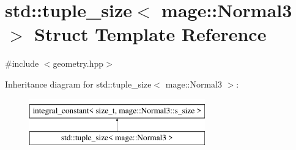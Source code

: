\hypertarget{structstd_1_1tuple__size_3_01mage_1_1_normal3_01_4}{}\section{std\+:\+:tuple\+\_\+size$<$ mage\+:\+:Normal3 $>$ Struct Template Reference}
\label{structstd_1_1tuple__size_3_01mage_1_1_normal3_01_4}


{\ttfamily \#include $<$geometry.\+hpp$>$}

Inheritance diagram for std\+:\+:tuple\+\_\+size$<$ mage\+:\+:Normal3 $>$\+:\begin{figure}[H]
\begin{center}
\leavevmode
\includegraphics[height=2.000000cm]{structstd_1_1tuple__size_3_01mage_1_1_normal3_01_4}
\end{center}
\end{figure}
